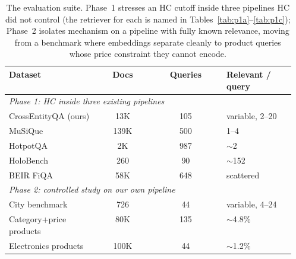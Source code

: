 \documentclass[letterpaper]{article}
\begin{document}
\begin{table}[t]
\centering\small
\setlength{\extrarowheight}{1pt}
\begin{tabular}{|p{0.32\linewidth}|c|c|p{0.24\linewidth}|}
\hline
\textbf{Dataset} & \textbf{Docs} & \textbf{Queries} & \textbf{Relevant / query} \\
\hline
\multicolumn{4}{|l|}{\emph{Phase 1: HC inside three existing pipelines}}\\
\hline
CrossEntityQA (ours) & 13K & 105 & variable, 2--20 \\
\hline
MuSiQue & 139K & 500 & 1--4 \\
\hline
HotpotQA & 2K & 987 & $\sim$2 \\
\hline
HoloBench & 260 & 90 & $\sim$152 \\
\hline
BEIR FiQA & 58K & 648 & scattered \\
\hline
\multicolumn{4}{|l|}{\emph{Phase 2: controlled study on our own pipeline}}\\
\hline
City benchmark & 726 & 44 & variable, 4--24 \\
\hline
Category+price products & 80K & 135 & $\sim$4.8\% \\
\hline
Electronics products & 100K & 44 & $\sim$1.2\% \\
\hline
\end{tabular}
\caption{The evaluation suite. Phase~1 stresses an HC cutoff inside
three pipelines HC did not control (the retriever for each is named in
Tables~\ref{tab:p1a}--\ref{tab:p1c}); Phase~2 isolates mechanism on a
pipeline with fully known relevance, moving from a benchmark where
embeddings separate cleanly to product queries whose price constraint
they cannot encode.}
\label{tab:datasets}
\end{table}

\end{document}

